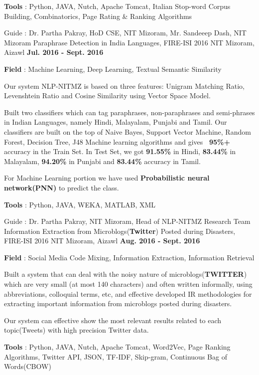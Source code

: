 \begin{cventries}
{\begin{cvitems}
        \item{\textbf{Tools} : Python, JAVA, Nutch, Apache Tomcat, Italian Stop-word Corpus Building, Combinatorics, Page Rating \& Ranking Algorithms}
      \end{cvitems} 
    }
  \cventry
    {Guide : Dr. Partha Pakray, HoD CSE, NIT Mizoram, Mr. Sandeeep Dash, NIT Mizoram}
    {Paraphrase Detection in India Languages, FIRE-ISI 2016}
    {NIT Mizoram, Aizawl}
    {\textbf{Jul. 2016 - Sept. 2016}}
    {
      \begin{cvitems}
      \item{\textbf{Field} : Machine Learning, Deep Learning, Textual Semantic Similarity}
        \item {Our system  NLP-NITMZ is based on three features: Unigram Matching Ratio, Levenshtein Ratio and Cosine Similarity using Vector Space Model.}
        \item {Built two classifiers which can tag paraphrases, non-paraphrases and semi-phrases in Indian Languages,
namely Hindi, Malayalam, Punjabi and Tamil. Our classifiers are built on the top of Naive Bayes, Support Vector Machine,
Random Forest, Decision Tree, J48 Machine learning algorithms and gives \textbf{~95\%+} accuracy in the Train Set. In Test Set, we got \textbf{91.55\%} in Hindi, \textbf{83.44\%} in Malayalam, \textbf{94.20\%} in Punjabi and \textbf{83.44\%} accuracy in Tamil.}
    \item{For Machine Learning portion we have used \textbf{Probabilistic neural network(PNN)} to predict the class.}
    \item{\textbf{Tools} : Python, JAVA, WEKA, MATLAB, XML}
      \end{cvitems}
    }
  \cventry
    {Guide : Dr. Partha Pakray, NIT Mizoram, Head of NLP-NITMZ Research Team}
    {Information Extraction from Microblogs(\textbf{Twitter}) Posted during Disasters, FIRE-ISI 2016}
    {NIT Mizoram, Aizawl}
    {\textbf{Aug. 2016 - Sept. 2016}}
    {
      \begin{cvitems}
        \item{\textbf{Field} : Social Media Code Mixing, Information Extraction, Information Retrieval}
        \item{Built a system that can deal with the noisy nature of microblogs(\textbf{TWITTER}) which are very small (at most 140 characters) and often written informally, using abbreviations, colloquial terms, etc, and 
effective developed IR methodologies for extracting important information from microblogs posted during disasters.}
        \item{Our system can effective show the most relevant results related to each topic(Tweets) with high precision Twitter data.}
        \item{\textbf{Tools} : Python, JAVA, Nutch, Apache Tomcat, Word2Vec, Page Ranking Algorithms, Twitter API, JSON, TF-IDF, Skip-gram, Continuous Bag of Words(CBOW)}
      \end{cvitems} 
    }
\end{cventries}  

